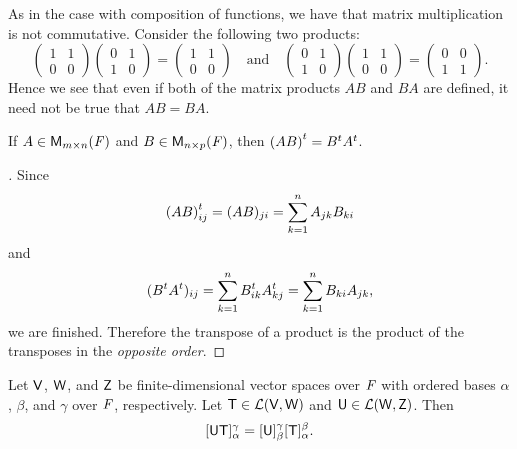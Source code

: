 \begin{note}
	As in the case with composition of functions, we have that matrix multiplication is not commutative. Consider the following two products:
	\[
		\begin{pmatrix}
			1 & 1 \\
			0 & 0
		\end{pmatrix} \begin{pmatrix}
			0 & 1 \\
			1 & 0
		\end{pmatrix} = \begin{pmatrix}
			1 & 1 \\
			0 & 0
		\end{pmatrix} \quad \text{and} \quad \begin{pmatrix}
			0 & 1 \\
			1 & 0
		\end{pmatrix} \begin{pmatrix}
			1 & 1 \\
			0 & 0
		\end{pmatrix} = \begin{pmatrix}
			0 & 0 \\
			1 & 1
		\end{pmatrix}.
	\]
	Hence we see that even if both of the matrix products \(AB\) and \(BA\) are defined, it need not be true that \(AB = BA\).
\end{note}

\begin{eg}\label{2.3.2}
	If \(A \in \mathsf{M}_{{m} \times n}({\mathit{F}})\) and \(B \in \mathsf{M}_{{n} \times p}({\mathit{F}})\), then \({(AB)}^{t} = {B}^{t} {A}^{t}\).
\end{eg}

\begin{proof}[]
	Since
	\[
		{(AB)}^{t}_{i j} = (AB)_{j i} = \sum_{k = 1}^n A_{j k} B_{k i}
	\]
	and
	\[
		({B}^{t} {A}^{t})_{i j} = \sum_{k = 1}^n {B}^{t}_{i k} {A}^{t}_{k j} = \sum_{k = 1}^n B_{k i} A_{j k},
	\]
	we are finished.
	Therefore the transpose of a product is the product of the transposes in the \emph{opposite order}.
\end{proof}

\begin{thm}\label{2.11}
	Let \(\mathsf{V}\), \(\mathsf{W}\), and \(\mathsf{Z}\) be finite-dimensional vector spaces over \(\mathit{F}\) with ordered bases \(\alpha\), \(\beta\), and \(\gamma\) over \(\mathit{F}\), respectively.
	Let \(\mathsf{T} \in \mathcal{L}(\mathsf{V}, \mathsf{W})\) and \(\mathsf{U} \in \mathcal{L}(\mathsf{W}, \mathsf{Z})\).
	Then
	\[
		[\mathsf{U} \mathsf{T}]_{\alpha}^{\gamma} = [\mathsf{U}]_{\beta}^{\gamma} [\mathsf{T}]_{\alpha}^{\beta}.
	\]
\end{thm}

